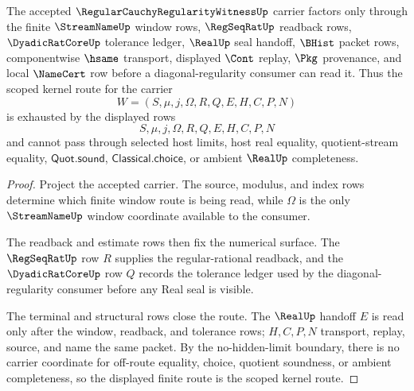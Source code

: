 \begin{theorem}
\label{thm:regular-cauchy-regularity-witness-scoped-kernel-route}
The accepted $\RegularCauchyRegularityWitnessUp$ carrier factors only through
the finite $\StreamNameUp$ window rows, $\RegSeqRatUp$ readback rows,
$\DyadicRatCoreUp$ tolerance ledger, $\RealUp$ seal handoff, $\BHist$ packet
rows, componentwise $\hsame$ transport, displayed $\Cont$ replay, $\Pkg$
provenance, and local $\NameCert$ row before a diagonal-regularity consumer can
read it. Thus the scoped kernel route for the carrier
$$
W=(S,\mu,j,\Omega,R,Q,E,H,C,P,N)
$$
is exhausted by the displayed rows
$$
S,\mu,j,\Omega,R,Q,E,H,C,P,N
$$
and cannot pass through selected host limits, host real equality,
quotient-stream equality, $\mathsf{Quot.sound}$, $\mathsf{Classical.choice}$,
or ambient $\RealUp$ completeness.
\end{theorem}
\begin{proof}
Project the accepted carrier. The source, modulus, and index rows determine
which finite window route is being read, while $\Omega$ is the only
$\StreamNameUp$ window coordinate available to the consumer.

The readback and estimate rows then fix the numerical surface. The
$\RegSeqRatUp$ row $R$ supplies the regular-rational readback, and the
$\DyadicRatCoreUp$ row $Q$ records the tolerance ledger used by the
diagonal-regularity consumer before any Real seal is visible.

The terminal and structural rows close the route. The $\RealUp$ handoff $E$ is
read only after the window, readback, and tolerance rows; $H,C,P,N$ transport,
replay, source, and name the same packet. By the no-hidden-limit boundary,
there is no carrier coordinate for off-route equality, choice, quotient soundness,
or ambient completeness, so the displayed finite route is the scoped kernel
route.
\end{proof}

